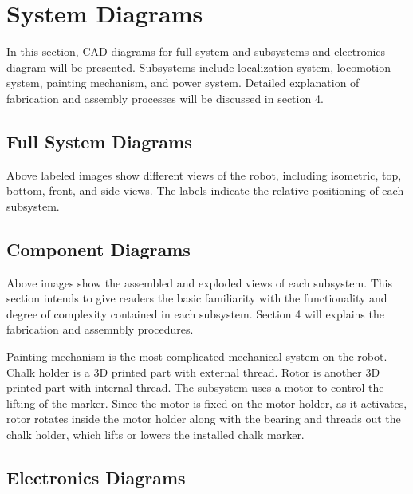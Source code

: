 
\section{System Diagrams}
\label{sec:system_diagrams}

In this section, CAD diagrams for full system and subsystems and electronics diagram will be presented. Subsystems include localization system, locomotion system, painting mechanism, and power system. Detailed explanation of fabrication and assembly processes will be discussed in section 4. 

\subsection{Full System Diagrams}
\label{sec:full_sys_diagrams}

Above labeled images show different views of the robot, including isometric, top, bottom, front, and side views. The labels indicate the relative positioning of each subsystem. 

\subsection{Component Diagrams}
\label{sec:component_diagrams}

Above images show the assembled and exploded views of each subsystem. This section intends to give readers the basic familiarity with the functionality and degree of complexity contained in each subsystem. Section 4 will explains the fabrication and assemnbly procedures. 

Painting mechanism is the most complicated mechanical system on the robot. Chalk holder is a 3D printed part with external thread. Rotor is another 3D printed part with internal thread. The subsystem uses a motor to control the lifting of the marker. Since the motor is fixed on the motor holder, as it activates, rotor rotates inside the motor holder along with the bearing and threads out the chalk holder, which lifts or lowers the installed chalk marker.

\subsection{Electronics Diagrams}
\label{sec:electronics_diagrams}

